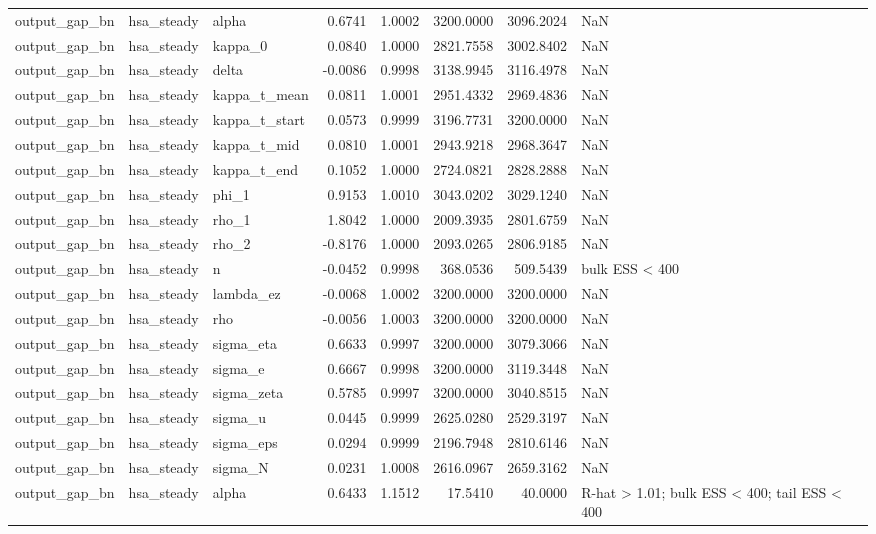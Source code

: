 \begin{tabular}{lllrrrrl}
output\_gap\_bn & hsa\_steady & alpha & 0.6741 & 1.0002 & 3200.0000 & 3096.2024 & NaN \\
output\_gap\_bn & hsa\_steady & kappa\_0 & 0.0840 & 1.0000 & 2821.7558 & 3002.8402 & NaN \\
output\_gap\_bn & hsa\_steady & delta & -0.0086 & 0.9998 & 3138.9945 & 3116.4978 & NaN \\
output\_gap\_bn & hsa\_steady & kappa\_t\_mean & 0.0811 & 1.0001 & 2951.4332 & 2969.4836 & NaN \\
output\_gap\_bn & hsa\_steady & kappa\_t\_start & 0.0573 & 0.9999 & 3196.7731 & 3200.0000 & NaN \\
output\_gap\_bn & hsa\_steady & kappa\_t\_mid & 0.0810 & 1.0001 & 2943.9218 & 2968.3647 & NaN \\
output\_gap\_bn & hsa\_steady & kappa\_t\_end & 0.1052 & 1.0000 & 2724.0821 & 2828.2888 & NaN \\
output\_gap\_bn & hsa\_steady & phi\_1 & 0.9153 & 1.0010 & 3043.0202 & 3029.1240 & NaN \\
output\_gap\_bn & hsa\_steady & rho\_1 & 1.8042 & 1.0000 & 2009.3935 & 2801.6759 & NaN \\
output\_gap\_bn & hsa\_steady & rho\_2 & -0.8176 & 1.0000 & 2093.0265 & 2806.9185 & NaN \\
output\_gap\_bn & hsa\_steady & n & -0.0452 & 0.9998 & 368.0536 & 509.5439 & bulk ESS < 400 \\
output\_gap\_bn & hsa\_steady & lambda\_ez & -0.0068 & 1.0002 & 3200.0000 & 3200.0000 & NaN \\
output\_gap\_bn & hsa\_steady & rho & -0.0056 & 1.0003 & 3200.0000 & 3200.0000 & NaN \\
output\_gap\_bn & hsa\_steady & sigma\_eta & 0.6633 & 0.9997 & 3200.0000 & 3079.3066 & NaN \\
output\_gap\_bn & hsa\_steady & sigma\_e & 0.6667 & 0.9998 & 3200.0000 & 3119.3448 & NaN \\
output\_gap\_bn & hsa\_steady & sigma\_zeta & 0.5785 & 0.9997 & 3200.0000 & 3040.8515 & NaN \\
output\_gap\_bn & hsa\_steady & sigma\_u & 0.0445 & 0.9999 & 2625.0280 & 2529.3197 & NaN \\
output\_gap\_bn & hsa\_steady & sigma\_eps & 0.0294 & 0.9999 & 2196.7948 & 2810.6146 & NaN \\
output\_gap\_bn & hsa\_steady & sigma\_N & 0.0231 & 1.0008 & 2616.0967 & 2659.3162 & NaN \\
output\_gap\_bn & hsa\_steady & alpha & 0.6433 & 1.1512 & 17.5410 & 40.0000 & R-hat > 1.01; bulk ESS < 400; tail ESS < 400 \\

\end{tabular}
